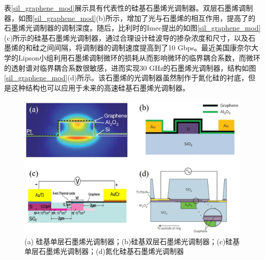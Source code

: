 表\ref{sil_graphene_mod}展示具有代表性的硅基石墨烯光调制器。双层石墨烯调制器，如图\ref{sil_graphene_mod}(b)所示，增加了光与石墨烯的相互作用，提高了的石墨烯光调制器的调制深度。随后，比利时的Imec提出的如图\ref{sil_graphene_mod}(c)所示的硅基石墨烯光调制器，通过合理设计硅波导的掺杂浓度和尺寸，以及石墨烯的和硅之间间隔，将调制器的调制速度提高到了10 Gbps\cite{liu2011graphene, hu2016broadband}。最近美国康奈尔大学的Lipson小组利用石墨烯调制微环的损耗从而影响微环的临界耦合系数，而微环的透射谱对临界耦合系数很敏感，进而实现30 GHz的石墨烯光调制器，结构如图\ref{sil_graphene_mod}(d)所示。该石墨烯的光调制器虽然制作于氮化硅的衬底，但是这种结构也可以应用于未来的高速硅基石墨烯光调制器。

\begin{figure}[htb]
	\centering
	\includegraphics[width=12cm]{./Pictures/fig_graphene_mod.jpg}
	\caption{ (a) 硅基单层石墨烯光调制器\cite{liu2011graphene}；(b)硅基双层石墨烯光调制器\cite{liu2012double}；(c)硅基单层石墨烯光调制器\cite{hu2014broadband, hu2016broadband}；(d)氮化硅基石墨烯光调制器\cite{phare2015graphene}}
	\label{fig_ge_mod}
\end{figure}

